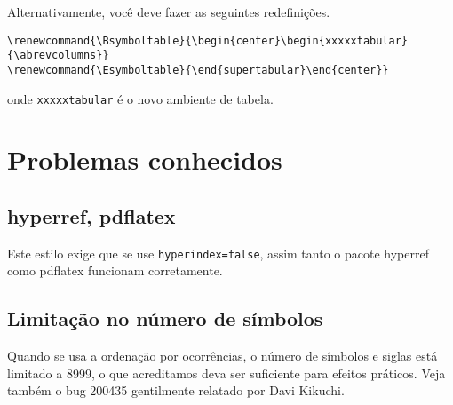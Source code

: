 \documentclass[espacosimples]{abnt}
\begin{document}
Alternativamente, você deve fazer as seguintes redefinições.
\begin{verbatim}
\renewcommand{\Bsymboltable}{\begin{center}\begin{xxxxxtabular}{\abrevcolumns}}
\renewcommand{\Esymboltable}{\end{supertabular}\end{center}}
\end{verbatim}
onde {\tt xxxxxtabular} é o novo ambiente de tabela.

\section{Problemas conhecidos}

\subsection{hyperref, pdflatex}

Este estilo exige que se use {\tt hyperindex=false}, assim tanto
o pacote hyperref como pdflatex funcionam corretamente.

\subsection{Limitação no número de símbolos}

Quando se usa a ordenação por ocorrências, o número de símbolos e siglas está limitado
a 8999, o que acreditamos deva ser suficiente para efeitos práticos. 
Veja também o bug 200435 gentilmente relatado por Davi Kikuchi.



\end{document}
